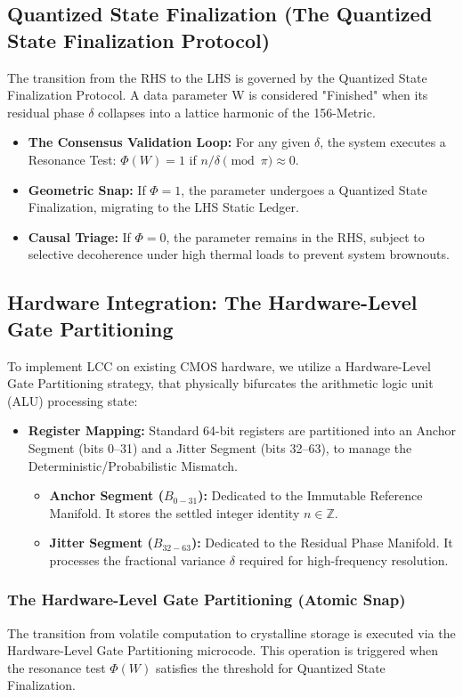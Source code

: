 \documentclass[fleqn,10pt,lineno]{wlpeerj}
\begin{document}
\subsection*{Quantized State Finalization (The Quantized State Finalization Protocol)}
The transition from the RHS to the LHS is governed by the Quantized State Finalization Protocol. A data parameter W is considered "Finished" when its residual phase $\delta$ collapses into a lattice harmonic of the 156-Metric.
\begin{itemize}
\item \textbf{The Consensus Validation Loop:} For any given $\delta$, the system executes a Resonance Test: $\Phi(W) = 1$ if $n/\delta \pmod \pi \approx 0$.
\item \textbf{Geometric Snap:} If $\Phi = 1$, the parameter undergoes a Quantized State Finalization, migrating to the LHS Static Ledger.
\item \textbf{Causal Triage:} If $\Phi = 0$, the parameter remains in the RHS, subject to selective decoherence under high thermal loads to prevent system brownouts.
\end{itemize}

\subsection*{Hardware Integration: The Hardware-Level Gate Partitioning}
To implement LCC on existing CMOS hardware, we utilize a Hardware-Level Gate Partitioning strategy, that physically bifurcates the arithmetic logic unit (ALU) processing state:
\begin{itemize}
\item \textbf{Register Mapping:} Standard 64-bit registers are partitioned into an Anchor Segment (bits 0–31) and a Jitter Segment (bits 32–63), to manage the Deterministic/Probabilistic Mismatch.
\begin{itemize}
    \item \textbf{Anchor Segment ($B_{0-31}$):} Dedicated to the Immutable Reference Manifold. It stores the settled integer identity $n \in \mathbb{Z}$.
    \item \textbf{Jitter Segment ($B_{32-63}$):} Dedicated to the Residual Phase Manifold. It processes the fractional variance $\delta$ required for high-frequency resolution.
\end{itemize}
\end{itemize} 

\subsubsection*{The Hardware-Level Gate Partitioning (Atomic Snap)}
The transition from volatile computation to crystalline storage is executed via the Hardware-Level Gate Partitioning microcode. 
This operation is triggered when the resonance test $\Phi(W)$ satisfies the threshold for Quantized State Finalization.
\end{document}
